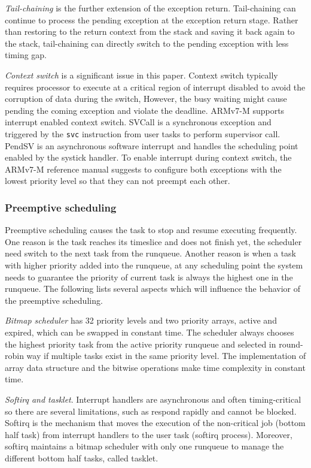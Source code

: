 \textit{Tail-chaining} is the further extension of the exception return. Tail-chaining can continue to process the pending exception at the exception return stage. Rather than restoring to the return context from the stack and saving it back again to the stack, tail-chaining can directly switch to the pending exception with less timing gap.

\textit{Context switch} is a significant issue in this paper. Context switch typically requires processor to execute at a critical region of interrupt disabled to avoid the corruption of data during the switch, However, the busy waiting might cause pending the coming exception and violate the deadline. ARMv7-M supports interrupt enabled context switch. SVCall is a synchronous exception and triggered by the \texttt{svc} instruction from user tasks to perform supervisor call. PendSV is an asynchronous software interrupt and handles the scheduling point enabled by the systick handler. To enable interrupt during context switch, the ARMv7-M reference manual suggests to configure both exceptions with the lowest priority level so that they can not preempt each other.

\subsubsection{Preemptive scheduling}
Preemptive scheduling causes the task to stop and resume executing frequently. One reason is the task reaches its timeslice and does not finish yet, the scheduler need switch to the next task from the runqueue. Another reason is when a task with higher priority added into the runqueue, at any scheduling point the system needs to guarantee the priority of current task is always the highest one in the runqueue. The following lists several aspects which will influence the behavior of the preemptive scheduling.

\textit{Bitmap scheduler} has 32 priority levels and two priority arrays, active and expired, which can be swapped in constant time. The scheduler always chooses the highest priority task from the active priority runqueue and selected in round-robin way if multiple tasks exist in the same priority level. The implementation of array data structure and the bitwise operations make time complexity in constant time.

\textit{Softirq and tasklet}. Interrupt handlers are asynchronous and often timing-critical so there are several limitations, such as respond rapidly and cannot be blocked. Softirq is the mechanism that moves the execution of the non-critical job (bottom half task) from interrupt handlers to the user task (softirq process). Moreover, softirq maintains a bitmap scheduler with only one runqueue to manage the different bottom half tasks, called tasklet.

